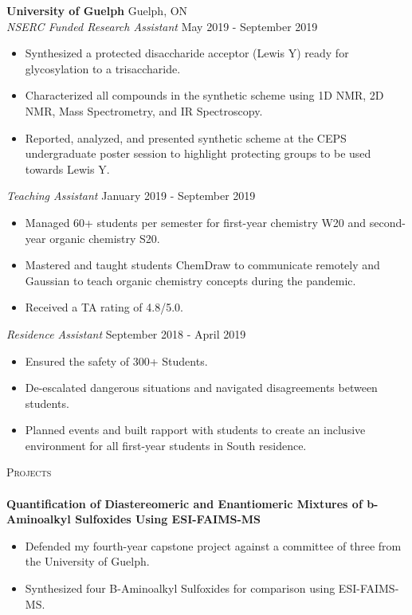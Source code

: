 \documentclass[a4paper]{article}
\newcommand{\lineunder} {
    \vspace*{-8pt} \\
    \hspace*{-18pt} \hrulefill \\
}
\newcommand{\header} [1] {
    {\hspace*{-18pt}\vspace*{6pt} \textsc{#1}}
    \vspace*{-6pt} \lineunder
}
\begin{document}
\textbf{University of Guelph} \hfill Guelph, ON\\
\textit{NSERC Funded Research Assistant} \hfill May 2019 - September 2019\\
\vspace{-1mm}
\begin{itemize} \itemsep 1pt
	\item Synthesized a protected disaccharide acceptor (Lewis Y)          ready for glycosylation to a trisaccharide.
	\item Characterized all compounds in the synthetic scheme using        1D NMR, 2D NMR, Mass Spectrometry, and IR Spectroscopy.
        \item Reported, analyzed, and presented synthetic scheme at the CEPS undergraduate poster session to highlight protecting groups to be used towards Lewis Y.
\end{itemize}

\textit{Teaching Assistant} \hfill January 2019 - September 2019\\
\vspace{-1mm}
\begin{itemize} \itemsep 1pt
	\item Managed 60+ students per semester for first-year chemistry       W20 and second-year organic chemistry S20. 
        \item Mastered and taught students ChemDraw to communicate remotely and Gaussian to teach organic chemistry concepts during the pandemic.
	\item Received a TA rating of 4.8/5.0.
\end{itemize}

\textit{Residence Assistant} \hfill September 2018 - April 2019\\
\vspace{-1mm}
\begin{itemize} \itemsep 1pt
	\item Ensured the safety of 300+ Students.
	\item De-escalated dangerous situations and navigated                  disagreements between students.
        \item Planned events and built rapport with students to create an inclusive environment for all first-year students in South residence.
\end{itemize}


\header{Projects}

{\textbf{Quantification of Diastereomeric and Enantiomeric Mixtures of b-Aminoalkyl Sulfoxides Using ESI-FAIMS-MS}} \\
\vspace{-1mm}
\begin{itemize} \itemsep 1pt
	\item Defended my fourth-year capstone project against a committee of three from the University of Guelph.
	\item Synthesized four B-Aminoalkyl Sulfoxides for comparison using ESI-FAIMS-MS.
\end{itemize}
\vspace*{1mm}
\end{document}
